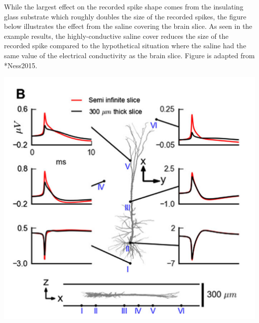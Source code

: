 While the largest effect on the recorded spike shape comes from the insulating 
glass substrate which roughly doubles the size of the recorded spikes, the figure below illustrates the 
effect from the saline covering the brain slice. As seen in the example results, the highly-conductive 
saline cover reduces the size of the recorded spike compared to the hypothetical 
situation where the saline had the same value of the electrical conductivity as the brain slice.
Figure is adapted from \citeasnoun**{Ness2015}.
%
\begin{center}
\includegraphics{Figures/Spikes/Spikes-MEA-2-w43-r300}
\end{center}
%


